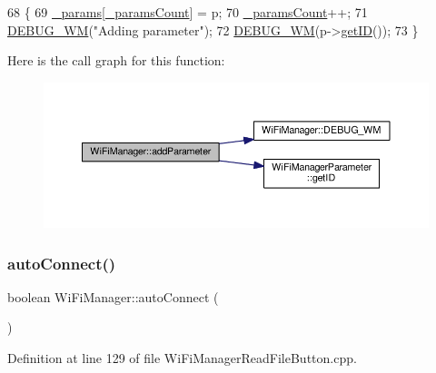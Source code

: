 \begin{DoxyCode}
68                                                       \{
69   \hyperlink{class_wi_fi_manager_a355ce9bbaab94baffd1c83de9b166fea}{\_params}[\hyperlink{class_wi_fi_manager_a22e803d23ae77cb611914445db17c9b6}{\_paramsCount}] = p;
70   \hyperlink{class_wi_fi_manager_a22e803d23ae77cb611914445db17c9b6}{\_paramsCount}++;
71   \hyperlink{class_wi_fi_manager_ae5f595c670ccbcf9a191baf50f5c7c26}{DEBUG\_WM}(\textcolor{stringliteral}{"Adding parameter"});
72   \hyperlink{class_wi_fi_manager_ae5f595c670ccbcf9a191baf50f5c7c26}{DEBUG\_WM}(p->\hyperlink{class_wi_fi_manager_parameter_af57919615418fff788310ba9cc2664d8}{getID}());
73 \}
\end{DoxyCode}
Here is the call graph for this function\+:\nopagebreak
\begin{figure}[H]
\begin{center}
\leavevmode
\includegraphics[width=350pt]{d4/dc8/class_wi_fi_manager_a62907428e5874de097d83c33ef46c80d_cgraph}
\end{center}
\end{figure}
\mbox{\label{class_wi_fi_manager_ae3cdfa6b02edcfe63d7da4f696b62136}} 
\subsubsection{\texorpdfstring{auto\+Connect()}{autoConnect()}\hspace{0.1cm}{\footnotesize\ttfamily [1/2]}}
{\footnotesize\ttfamily boolean Wi\+Fi\+Manager\+::auto\+Connect (\begin{DoxyParamCaption}{ }\end{DoxyParamCaption})}



Definition at line 129 of file Wi\+Fi\+Manager\+Read\+File\+Button.\+cpp.


